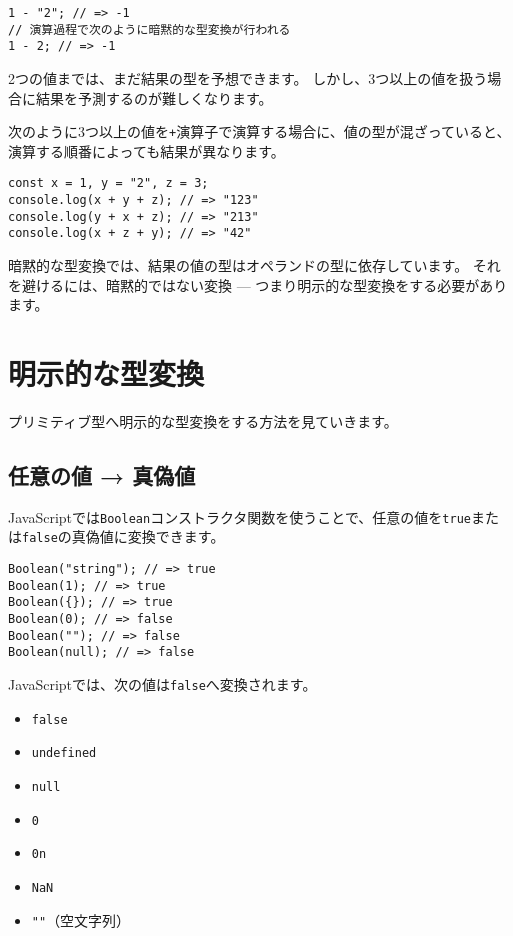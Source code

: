 \begin{lstlisting}
1 - "2"; // => -1
// 演算過程で次のように暗黙的な型変換が行われる
1 - 2; // => -1
\end{lstlisting}

2つの値までは、まだ結果の型を予想できます。
しかし、3つ以上の値を扱う場合に結果を予測するのが難しくなります。

次のように3つ以上の値を\texttt{+}演算子で演算する場合に、値の型が混ざっていると、
演算する順番によっても結果が異なります。

\begin{lstlisting}
const x = 1, y = "2", z = 3;
console.log(x + y + z); // => "123"
console.log(y + x + z); // => "213"
console.log(x + z + y); // => "42"
\end{lstlisting}

暗黙的な型変換では、結果の値の型はオペランドの型に依存しています。
それを避けるには、暗黙的ではない変換 ---
つまり明示的な型変換をする必要があります。

\hypertarget{explicit-coercion}{%
\section{明示的な型変換}\label{explicit-coercion}}

プリミティブ型へ明示的な型変換をする方法を見ていきます。

\hypertarget{any-to-boolean}{%
\subsection{任意の値 → 真偽値}\label{any-to-boolean}}

JavaScriptでは\texttt{Boolean}コンストラクタ関数を使うことで、任意の値を\texttt{true}または\texttt{false}の真偽値に変換できます。

\begin{lstlisting}
Boolean("string"); // => true
Boolean(1); // => true
Boolean({}); // => true
Boolean(0); // => false
Boolean(""); // => false
Boolean(null); // => false
\end{lstlisting}

JavaScriptでは、次の値は\texttt{false}へ変換されます。

\begin{itemize}
\item
  \texttt{false}
\item
  \texttt{undefined}
\item
  \texttt{null}
\item
  \texttt{0}
\item
  \texttt{0n}
\item
  \texttt{NaN}
\item
  \texttt{""}（空文字列）
\end{itemize}

